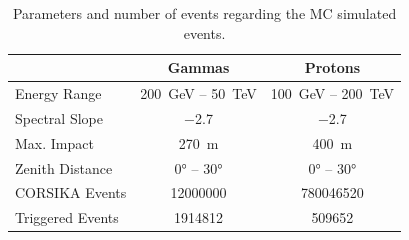\begin{table}
  \centering%
  \begin{tabular}{l
                  c
                  c}
      \toprule
      {}    & Gammas  & Protons      \\
      \midrule
      Energy Range & \SI{200}{\GeV} – \SI{50}{\TeV} & \SI{100}{\GeV} – \SI{200}{\TeV} \\
      Spectral Slope & \num{-2.7} & \num{-2.7} \\
      Max. Impact & \SI{270}{\meter} & \SI{400}{\meter} \\
      Zenith Distance & \ang{0} – \ang{30} & \ang{0} – \ang{30} \\
      CORSIKA Events & \num{12000000} & \num{780046520}\\
      Triggered Events & \num{1914812} & \num{509652}\\
      \bottomrule
  \end{tabular}
  \caption{Parameters and number of events regarding the MC simulated events.}
  \label{tab:mcs}
\end{table}
